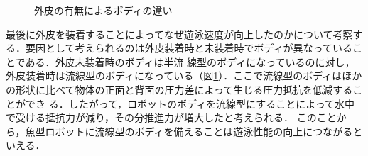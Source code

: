 \begin{figure}[t]
    \centering
    \caption{外皮の有無によるボディの違い}
    \label{fig:body}
\end{figure}

最後に外皮を装着することによってなぜ遊泳速度が向上したのかについて考察する．要因として考えられるのは外皮装着時と未装着時でボディが異なっていることである．外皮未装着時のボディは半流
線型のボディになっているのに対し，外皮装着時は流線型のボディになっている（図\ref{fig:body}）．ここで流線型のボディはほかの形状に比べて物体の正面と背面の圧力差によって生じる圧力抵抗を低減することができ
る．したがって，ロボットのボディを流線型にすることによって水中で受ける抵抗力が減り，その分推進力が増大したと考えられる．
このことから，魚型ロボットに流線型のボディを備えることは遊泳性能の向上につながるといえる．